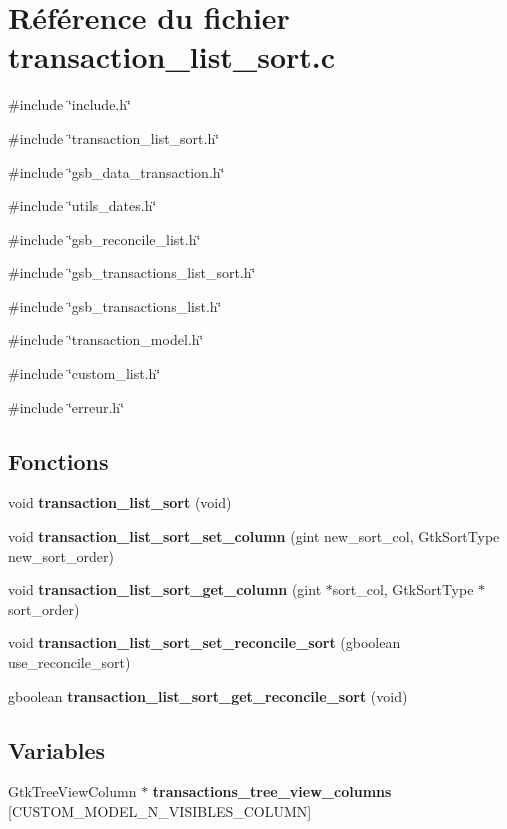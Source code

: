 \section{Référence du fichier transaction\_\-list\_\-sort.c}
\label{transaction__list__sort_8c}
{\ttfamily \#include \char`\"{}include.h\char`\"{}}\par
{\ttfamily \#include \char`\"{}transaction\_\-list\_\-sort.h\char`\"{}}\par
{\ttfamily \#include \char`\"{}gsb\_\-data\_\-transaction.h\char`\"{}}\par
{\ttfamily \#include \char`\"{}utils\_\-dates.h\char`\"{}}\par
{\ttfamily \#include \char`\"{}gsb\_\-reconcile\_\-list.h\char`\"{}}\par
{\ttfamily \#include \char`\"{}gsb\_\-transactions\_\-list\_\-sort.h\char`\"{}}\par
{\ttfamily \#include \char`\"{}gsb\_\-transactions\_\-list.h\char`\"{}}\par
{\ttfamily \#include \char`\"{}transaction\_\-model.h\char`\"{}}\par
{\ttfamily \#include \char`\"{}custom\_\-list.h\char`\"{}}\par
{\ttfamily \#include \char`\"{}erreur.h\char`\"{}}\par
\subsection*{Fonctions}
\begin{DoxyCompactItemize}
\item 
void {\bf transaction\_\-list\_\-sort} (void)
\item 
void {\bf transaction\_\-list\_\-sort\_\-set\_\-column} (gint new\_\-sort\_\-col, GtkSortType new\_\-sort\_\-order)
\item 
void {\bf transaction\_\-list\_\-sort\_\-get\_\-column} (gint $\ast$sort\_\-col, GtkSortType $\ast$sort\_\-order)
\item 
void {\bf transaction\_\-list\_\-sort\_\-set\_\-reconcile\_\-sort} (gboolean use\_\-reconcile\_\-sort)
\item 
gboolean {\bf transaction\_\-list\_\-sort\_\-get\_\-reconcile\_\-sort} (void)
\end{DoxyCompactItemize}
\subsection*{Variables}
\begin{DoxyCompactItemize}
\item 
GtkTreeViewColumn $\ast$ {\bf transactions\_\-tree\_\-view\_\-columns} [CUSTOM\_\-MODEL\_\-N\_\-VISIBLES\_\-COLUMN]
\end{DoxyCompactItemize}


